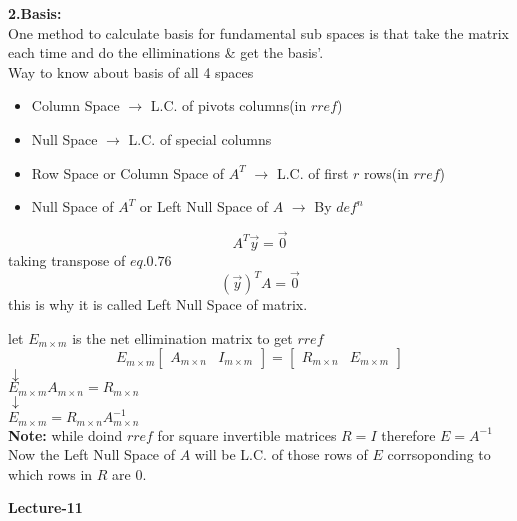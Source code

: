 \documentclass[a4paper,11pt]{article}
\numberwithin{equation}{section}
\begin{document}
\begin{itemize}
\textbf{2.Basis:}\\
One method to calculate basis for fundamental sub spaces is that take the matrix each time and do the elliminations \& get the basis'.\\

Way to know about basis of all 4 spaces
\begin{itemize}
    \item Column Space $\rightarrow$ L.C. of pivots columns(in $rref$)
    \item Null Space $\rightarrow$ L.C. of special columns 
    \item Row Space or Column Space of $A^T$ $\rightarrow$ L.C. of first $r$ rows(in $rref$)
    \item Null Space of $A^T$ or Left Null Space of $A$ $\rightarrow$ By $def^n$
\end{itemize}
\begin{equation}
        A^T\vec{y}=\vec{0}
\end{equation}
taking transpose of $eq.0.76$
\begin{equation}
    (\vec{y})^TA=\vec{0}
\end{equation}
this is why it is called Left Null Space of matrix.
\begin{center}
    let $E_{m\times m}$ is the net ellimination matrix to get $rref$
    \[
        E_{m\times m}
        \begin{bmatrix}
            A_{m\times n}&I_{m\times m}
        \end{bmatrix}=
        \begin{bmatrix}
            R_{m\times n}& E_{m\times m}
        \end{bmatrix}
    \]
$\downarrow$ \\
    $E_{m\times m}A_{m\times n}=R_{m\times n}$\\
$\downarrow$ \\
    $E_{m\times m}=R_{m\times n}A^{-1}_{m\times n}$\\
    \vspace{5pt}
\textbf{Note: }while doind $rref$ for square invertible matrices $R=I$ therefore $E=A^{-1}$\\
Now the Left Null Space of $A$ will be L.C. of those rows of $E$ corrsoponding to which rows in $R$ are $0$.
\end{center}

\vspace{0.1cm}
\begin{center}
    \Huge{\textbf{Lecture-11}}
\end{center}
\vspace{5pt}


\end{itemize}
\end{document}
